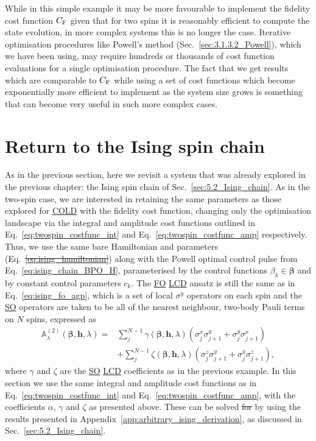 \documentclass[a4paper,oneside,11pt]{book}
\newcommand{\betabb}{\boldsymbol{\beta}}
\newcommand{\hbb}{\boldsymbol{h}}
\newcommand{\sx}{\sigma^x}
\newcommand{\sy}{\sigma^y}
\newcommand{\sz}{\sigma^z}
\newcommand{\approxAGP}{\mathbb{A}_{\lambda}}
\newcommand{\acrref}[1]{\hyperref[acr:#1]{#1}}
\providecommand{\DIFaddtex}[1]{{\protect\color{blue}\uwave{#1}}} %
\providecommand{\DIFdeltex}[1]{{\protect\color{red}\sout{#1}}}                      %
\providecommand{\DIFaddbegin}{} %
\providecommand{\DIFaddend}{} %
\providecommand{\DIFdelbegin}{} %
\providecommand{\DIFdelend}{} %
\providecommand{\DIFadd}[1]{\texorpdfstring{\DIFaddtex{#1}}{#1}} %
\providecommand{\DIFdel}[1]{\texorpdfstring{\DIFdeltex{#1}}{}} %
\newcommand{\DIFscaledelfig}{0.5}
\newlength{\DIFdelgraphicswidth} %
\newlength{\DIFdelgraphicsheight} %
\newcommand{\DIFaddincludegraphics}[2][]{{\color{blue}\fbox{\DIFOincludegraphics[#1]{#2}}}} %
\newcommand{\DIFdelincludegraphics}[2][]{%
\sbox{\DIFdelgraphicsbox}{\DIFOincludegraphics[#1]{#2}}%
\settoboxwidth{\DIFdelgraphicswidth}{\DIFdelgraphicsbox} %
\settoboxtotalheight{\DIFdelgraphicsheight}{\DIFdelgraphicsbox} %
\scalebox{\DIFscaledelfig}{%
\parbox[b]{\DIFdelgraphicswidth}{\usebox{\DIFdelgraphicsbox}\\[-\baselineskip] \rule{\DIFdelgraphicswidth}{0em}}\llap{\resizebox{\DIFdelgraphicswidth}{\DIFdelgraphicsheight}{%
\setlength{\unitlength}{\DIFdelgraphicswidth}%
\begin{picture}(1,1)%
\thicklines\linethickness{2pt} %
{\color[rgb]{1,0,0}\put(0,0){\framebox(1,1){}}}%
{\color[rgb]{1,0,0}\put(0,0){\line( 1,1){1}}}%
{\color[rgb]{1,0,0}\put(0,1){\line(1,-1){1}}}%
\end{picture}%
}\hspace*{3pt}}} %
} %
\DeclareRobustCommand{\DIFaddbegin}{\DIFOaddbegin \let\includegraphics\DIFaddincludegraphics} %
\DeclareRobustCommand{\DIFaddend}{\DIFOaddend \let\includegraphics\DIFOincludegraphics} %
\DeclareRobustCommand{\DIFdelbegin}{\DIFOdelbegin \let\includegraphics\DIFdelincludegraphics} %
\DeclareRobustCommand{\DIFdelend}{\DIFOaddend \let\includegraphics\DIFOincludegraphics} %
\begin{document}
While in this simple example it may be more favourable to implement the fidelity cost function $C_{\rm F}$ given that for two spins it is reasonably efficient to compute the state evolution, in more complex systems this is no longer the case. Iterative optimisation procedures like Powell's method (Sec.~\ref{sec:3.1.3.2_Powell}), which we have been using, may require hundreds or thousands of cost function evaluations for a single optimisation procedure. The fact that we get results which are comparable to $C_{\rm F}$ while using a set of cost functions which become exponentially more efficient to implement as the system size grows is something that can become very useful in such more complex cases.

\section{Return to the Ising spin chain}\label{sec:7.2_ising_ho_lcd}

As in the previous section, here we revisit a system that was already explored in the previous chapter: the Ising spin chain of Sec.~\ref{sec:5.2_Ising_chain}. As in the two-spin case, we are interested in retaining the same parameters as those explored for \acrref{COLD} with the fidelity cost function, changing only the optimisation landscape via the integral and amplitude cost functions outlined in Eq.~\eqref{eq:twospin_costfunc_int} and Eq.~\eqref{eq:twospin_costfunc_amp} respectively. Thus, we use the same bare Hamiltonian and parameters (Eq.~\DIFdelbegin \DIFdel{\eqref{eq:ising_hamiltonian}}\DIFdelend \DIFaddbegin \DIFadd{\eqref{eq:ising_chain_hamiltonian}}\DIFaddend ) along with the Powell optimal control pulse from Eq.~\eqref{eq:ising_chain_BPO_H}, parameterised by the control functions $\beta_k \in \betabb$ and by constant control parameters $c_k$. The \acrref{FO} \acrref{LCD} ansatz is still the same as in Eq.~\eqref{eq:ising_fo_agp}, which is a set of local $\sy$ operators on each spin and the \acrref{SO} operators are taken to be all of the nearest neighbour, two-body Pauli terms on $N$ spins, expressed as
\begin{equation}\label{eq:ising_so_lcd_terms}
    \begin{aligned}
        \approxAGP^{(2)}(\betabb, \hbb, \lambda) = & \sum_j^{N-1} \gamma(\betabb, \hbb, \lambda) (\sx_j\sy_{j+1} + \sy_j\sx_{j+1}) \\
        &+ \sum_j^{N-1} \zeta(\betabb, \hbb, \lambda) (\sz_j\sy_{j+1} + \sy_j\sz_{j+1}),
    \end{aligned}
\end{equation}
where $\gamma$ and $\zeta$ are the \acrref{SO} \acrref{LCD} coefficients as in the previous example. In this section we use the same integral and amplitude cost functions as in Eq.~\eqref{eq:twospin_costfunc_int} and Eq.~\eqref{eq:twospin_costfunc_amp}, with the coefficients $\alpha$, $\gamma$ and $\zeta$ as presented above. These can be solved \DIFdelbegin \DIFdel{for }\DIFdelend by using the results presented in Appendix~\ref{app:arbitrary_ising_derivation}, as discussed in Sec.~\ref{sec:5.2_Ising_chain}.
\end{document}
